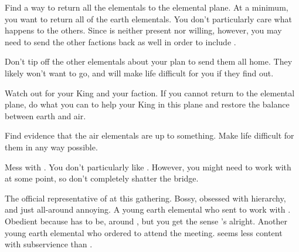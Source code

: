 \documentclass[char]{elementals}
\begin{document}
\begin{itemz}[Goals]
\item Find a way to return all the elementals to the elemental plane.  At a minimum, you want to return all of the earth elementals.  You don't particularly care what happens to the others.  Since \cEarthKing{} is neither present nor willing, however, you may need to send the other factions back as well in order to include \cEarthKing{\them}.
   \item Don't tip off the other elementals about your plan to send them all home.  They likely won't want to go, and will make life difficult for you if they find out.
   \item Watch out for your King and your faction.  If you cannot return to the elemental plane, do what you can to help your King in this plane and restore the balance between earth and air.
	\item Find evidence that the air elementals are up to something.  Make life difficult for them in any way possible.
	\item Mess with \cLoyal{}.  You don't particularly like \cLoyal{\them}.  However, you might need to work with \cLoyal{\them} at some point, so don't completely shatter the bridge.
\end{itemz}

\begin{contacts}
	\contact{\cLoyal{}}  The official representative of \cEarthKing{} at this gathering.  Bossy, obsessed with hierarchy, and just all-around annoying.
	\contact{\cMinion{}}  A young earth elemental who \cEarthKing{} sent to work with \cLoyal{}.  Obedient because \cMinion{\they} has to be, around \cLoyal{}, but you get the sense \cMinion{\they}'s  alright.
  \contact{\cMiniEarth{}}  Another young earth elemental who \cLoyal{} ordered to attend the meeting.  \cMiniEarth{\They} seems less content with subservience than \cMinion{}.
\end{contacts}
\end{document}
